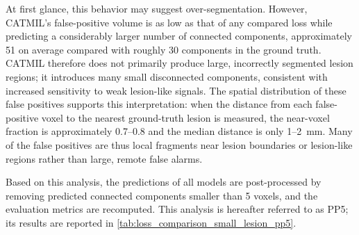 At first glance, this behavior may suggest over-segmentation. However,
CATMIL's false-positive volume is as low as that of any compared loss while
predicting a considerably larger number of connected components,
approximately 51 on average compared with roughly 30 components in the
ground truth. CATMIL therefore does not primarily produce large,
incorrectly segmented lesion regions; it introduces many small
disconnected components, consistent with increased sensitivity to weak
lesion-like signals. The spatial distribution of these false positives
supports this interpretation: when the distance from each false-positive
voxel to the nearest ground-truth lesion is measured, the near-voxel
fraction is approximately 0.7--0.8 and the median distance is only
1--2~mm. Many of the false positives are thus local fragments near lesion
boundaries or lesion-like regions rather than large, remote false alarms.

Based on this analysis, the predictions of all models are post-processed by
removing predicted connected components smaller than 5 voxels, and the
evaluation metrics are recomputed. This analysis is hereafter referred to
as PP5; its results are reported in
\cref{tab:loss_comparison_small_lesion_pp5}.

